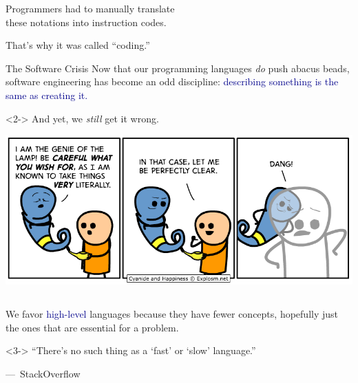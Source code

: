 \documentclass[aspectratio=169]{beamer}
\begin{document}
\begin{frame}{}
\Large
\vspace{1.25 cm}
\begin{center}
Programmers had to manually translate \\ these notations into instruction codes.

\vspace{1 cm}
{\huge That's why it was called ``coding.''}

\vspace{1 cm}
\end{center}
\end{frame}

\begin{frame}{The Software Crisis}
\large
\vspace{1 cm}
Now that our programming languages {\it do} push abacus beads, software engineering has become an odd discipline: \textcolor{darkblue}{describing something is the same as creating it.}

\vspace{1 cm}
\begin{uncoverenv}<2->
And yet, we {\it still} get it wrong.

\vspace{0.25 cm}
\begin{center}
\includegraphics[width=0.6\linewidth]{literal-genie.png}
\end{center}
\end{uncoverenv}
\end{frame}

\begin{frame}{}
\Large
\vspace{1.5 cm}
\begin{columns}
\begin{center}
We favor \textcolor{darkblue}{high-level} languages because they have fewer concepts, hopefully just the ones that are essential for a problem.

\vspace{1 cm}

\vspace{1 cm}
\begin{uncoverenv}<3->
``There's no such thing as a `fast' or `slow' language.''

\vspace{0.2 cm}
\hfill\mbox{--- StackOverflow\hspace{1 cm}}
\end{uncoverenv}
\end{center}
\end{columns}
\end{frame}
\end{document}
